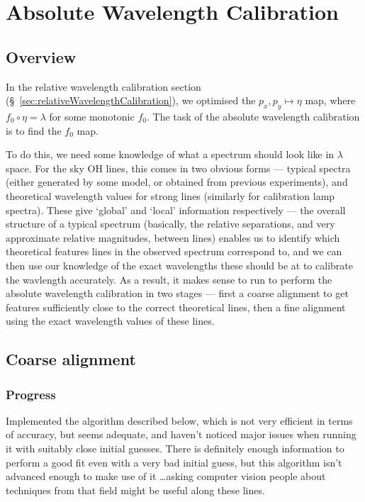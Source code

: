\section{Absolute Wavelength Calibration}
\label{sec:absoluteWavelengthCalibration}

\subsection{Overview}

In the relative wavelength calibration section
(\S~\ref{sec:relativeWavelengthCalibration}), we optimised the $p_x, p_y
\mapsto \eta$ map, where $f_0 \circ \eta = \lambda$ for some monotonic
$f_0$. The task of the absolute wavelength calibration is to find the
$f_0$ map.

To do this, we need some knowledge of what a spectrum should look like
in $\lambda$ space. For the sky OH lines, this comes in two obvious
forms --- typical spectra (either generated by some model, or obtained
from previous experiments), and theoretical wavelength values for
strong lines (similarly for calibration lamp spectra). These give
`global' and `local' information respectively --- the overall structure
of a typical spectrum (basically, the relative separations, and very
approximate relative magnitudes, between lines) enables us to identify
which theoretical features lines in the observed spectrum correspond
to, and we can then use our knowledge of the exact wavelengths these
should be at to calibrate the wavlength accurately. As a result, it
makes sense to run to perform the absolute wavelength calibration in two
stages --- first a coarse alignment to get features sufficiently close
to the correct theoretical lines, then a fine alignment using the exact
wavelength values of these lines.


\subsection{Coarse alignment}


\subsubsection{Progress}

Implemented the algorithm described below, which is not very efficient in terms
of accuracy, but seems adequate, and haven't noticed major issues when running
it with suitably close initial guesses. There is definitely enough information
to perform a good fit even with a very bad initial guess, but this algorithm
isn't advanced enough to make use of it \dots asking computer vision people
about techniques from that field might be useful along these lines.

